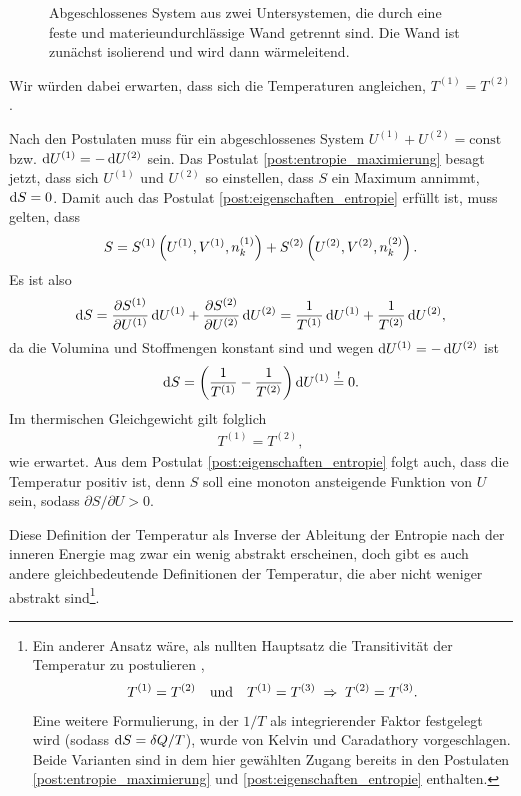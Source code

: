 \begin{figure}[htbp]
    \centering
    \tfigDoppelsystemUSfesteWaermeleitendeWand
    \caption{Abgeschlossenes System aus zwei Untersystemen, die durch eine feste und materieundurchlässige Wand getrennt sind. Die Wand ist zunächst isolierend und wird dann wärmeleitend.}
    \label{fig:DoppelsystemUSfesteWaermeleitendeWand}
\end{figure}

Wir würden dabei erwarten, dass sich die Temperaturen angleichen, $T^{(1)}=T^{(2)}$.

Nach den Postulaten muss für ein abgeschlossenes System $U^{(1)}+U^{(2)} = \mathrm{const}$ bzw. $\mathop{}\!\mathrm{d} U^{(1)} = -\mathop{}\!\mathrm{d} U^{(2)}$ sein. Das Postulat \ref{post:entropie_maximierung} besagt jetzt, dass sich $U^{(1)}$ und $U^{(2)}$ so einstellen, dass $S$ ein Maximum annimmt, $\mathop{}\!\mathrm{d} S=0$. Damit auch das Postulat \ref{post:eigenschaften_entropie} erfüllt ist, muss gelten, dass
\begin{align*}
    S=S^{(1)}\left(U^{(1)},V^{(1)},n^{(1)}_k\right) + S^{(2)}\left(U^{(2)},V^{(2)},n^{(2)}_k\right).
\end{align*}
Es ist also
\begin{align*}
    \mathop{}\!\mathrm{d} S = \frac{\partial S^{(1)}}{\partial U^{(1)}}\mathop{}\!\mathrm{d} U^{(1)}+ \frac{\partial S^{(2)}}{\partial U^{(2)}}\mathop{}\!\mathrm{d} U^{(2)} = \frac{1}{T^{(1)}}\mathop{}\!\mathrm{d} U^{(1)} + \frac{1}{T^{(2)}}\mathop{}\!\mathrm{d} U^{(2)},
\end{align*}
da die Volumina und Stoffmengen konstant sind und wegen $\mathop{}\!\mathrm{d} U^{(1)} = -\mathop{}\!\mathrm{d} U^{(2)}$ ist
\begin{align*}
    \mathop{}\!\mathrm{d} S = \left(\frac{1}{T^{(1)}}-\frac{1}{T^{(2)}}\right)\mathop{}\!\mathrm{d} U^{(1)} \overset{!}{=} 0.
\end{align*}
Im thermischen Gleichgewicht gilt folglich
\begin{align}
    \label{eq:thermisches_gg_temperatur}
    T^{(1)} = T^{(2)},
\end{align}
wie erwartet. Aus dem Postulat \ref{post:eigenschaften_entropie} folgt auch, dass die Temperatur positiv ist, denn $S$ soll eine monoton ansteigende Funktion von $U$ sein, sodass $\partial S/\partial U > 0$.

Diese Definition der Temperatur als Inverse der Ableitung der Entropie nach der inneren Energie mag zwar ein wenig abstrakt erscheinen, doch gibt es auch andere gleichbedeutende Definitionen der Temperatur, die aber nicht weniger abstrakt sind\footnote{Ein anderer Ansatz wäre, als nullten Hauptsatz die Transitivität der Temperatur zu postulieren \cite{lit:nolting1},
    \begin{align*}
        T^{(1)} = T^{(2)} \quad \text{und}\quad T^{(1)} = T^{(3)} \;\Rightarrow\; T^{(2)} = T^{(3)}.
    \end{align*}
    Eine weitere Formulierung, in der $1/T$ als integrierender Faktor festgelegt wird (sodass $\mathop{}\!\mathrm{d} S=\mathop{}\!\delta Q/T$), wurde von Kelvin und Caradathory vorgeschlagen.
    Beide Varianten sind in dem hier gewählten Zugang bereits in den Postulaten \ref{post:entropie_maximierung} und \ref{post:eigenschaften_entropie} enthalten.
}.

